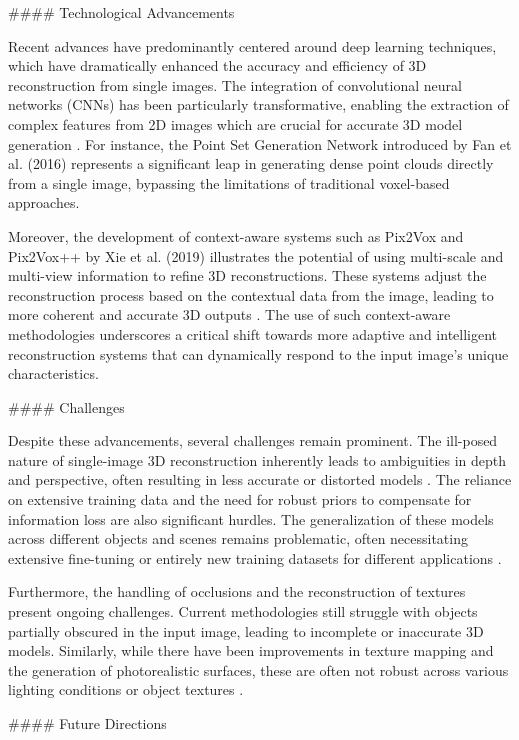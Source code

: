 \documentclass[conference]{IEEEtran}
\begin{document}
#### Technological Advancements

Recent advances have predominantly centered around deep learning techniques, which have dramatically enhanced the accuracy and efficiency of 3D reconstruction from single images. The integration of convolutional neural networks (CNNs) has been particularly transformative, enabling the extraction of complex features from 2D images which are crucial for accurate 3D model generation \cite{fan2016}. For instance, the Point Set Generation Network introduced by Fan et al. (2016) represents a significant leap in generating dense point clouds directly from a single image, bypassing the limitations of traditional voxel-based approaches.

Moreover, the development of context-aware systems such as Pix2Vox and Pix2Vox++ by Xie et al. (2019) illustrates the potential of using multi-scale and multi-view information to refine 3D reconstructions. These systems adjust the reconstruction process based on the contextual data from the image, leading to more coherent and accurate 3D outputs \cite{xie2019}. The use of such context-aware methodologies underscores a critical shift towards more adaptive and intelligent reconstruction systems that can dynamically respond to the input image's unique characteristics.

#### Challenges

Despite these advancements, several challenges remain prominent. The ill-posed nature of single-image 3D reconstruction inherently leads to ambiguities in depth and perspective, often resulting in less accurate or distorted models \cite{popov2020}. The reliance on extensive training data and the need for robust priors to compensate for information loss are also significant hurdles. The generalization of these models across different objects and scenes remains problematic, often necessitating extensive fine-tuning or entirely new training datasets for different applications \cite{popov2020}.

Furthermore, the handling of occlusions and the reconstruction of textures present ongoing challenges. Current methodologies still struggle with objects partially obscured in the input image, leading to incomplete or inaccurate 3D models. Similarly, while there have been improvements in texture mapping and the generation of photorealistic surfaces, these are often not robust across various lighting conditions or object textures \cite{fan2016}.

#### Future Directions
\end{document}
